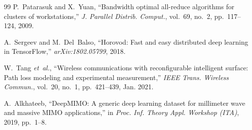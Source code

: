 \documentclass[conference]{IEEEtran}
\begin{document}
\begin{thebibliography}{99}
P.~Patarasuk and X.~Yuan, ``Bandwidth optimal all-reduce algorithms for clusters of workstations,'' \emph{J. Parallel Distrib. Comput.}, vol.~69, no.~2, pp.~117--124, 2009.

A.~Sergeev and M.~Del~Balso, ``Horovod: Fast and easy distributed deep learning in TensorFlow,'' \emph{arXiv:1802.05799}, 2018.

W.~Tang \emph{et~al.}, ``Wireless communications with reconfigurable intelligent surface: Path loss modeling and experimental measurement,'' \emph{IEEE Trans. Wireless Commun.}, vol.~20, no.~1, pp.~421--439, Jan. 2021.

A.~Alkhateeb, ``DeepMIMO: A generic deep learning dataset for millimeter wave and massive MIMO applications,'' in \emph{Proc. Inf. Theory Appl. Workshop (ITA)}, 2019, pp.~1--8.

\end{thebibliography}
\end{document}
